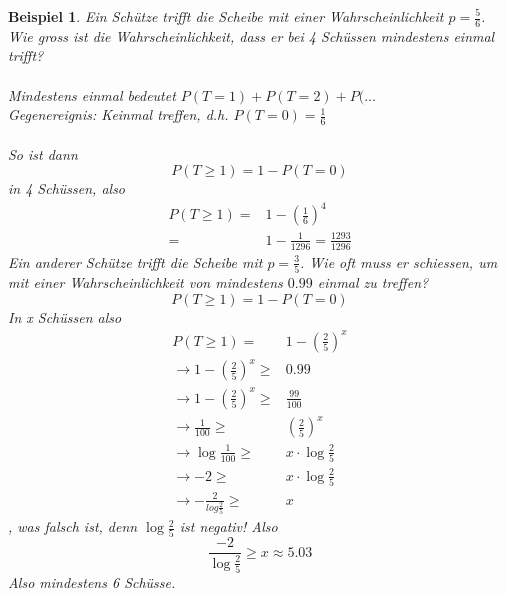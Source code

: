 \documentclass{report}
\newtheorem{myexample}{Beispiel}
\begin{document}
\begin{myexample}
Ein Schütze trifft die Scheibe mit einer Wahrscheinlichkeit $p = \frac{5}{6}$. Wie gross ist die Wahrscheinlichkeit, dass er bei 4 Schüssen mindestens einmal trifft?\\\\
Mindestens einmal bedeutet $P(T=1) + P(T=2) + P(...$\\
Gegenereignis: Keinmal treffen, d.h. $P(T=0) = \frac{1}{6}$\\\\
So ist dann
\begin{equation}
P(T\geq1) = 1 - P(T=0)
\end{equation}
in 4 Schüssen, also
\begin{align*}
P(T \geq 1) =& 1 - (\frac{1}{6})^4\\
=& 1 - \frac{1}{1296} = \frac{1293}{1296}
\end{align*}
Ein anderer Schütze trifft die Scheibe mit $p = \frac{3}{5}$. Wie oft muss er schiessen, um mit einer Wahrscheinlichkeit von mindestens $0.99$ einmal zu treffen?
\begin{equation}
P(T \geq 1) = 1 - P(T=0)
\end{equation}
In x Schüssen also
\begin{align*}
P(T \geq 1) =& 1 - (\frac{2}{5})^x\\
\longrightarrow 1 - (\frac{2}{5})^x \geq & 0.99\\
\longrightarrow 1 - (\frac{2}{5})^x \geq & \frac{99}{100}\\
\longrightarrow \frac{1}{100} \geq & (\frac{2}{5})^x \\
\longrightarrow \log{\frac{1}{100}} \geq & x \cdot \log{\frac{2}{5}} \\
\longrightarrow -2 \geq & x \cdot \log{\frac{2}{5}} \\
\longrightarrow -\frac{2}{log{\frac{2}{5}}} \geq & x
\end{align*}
, was falsch ist, denn $\log{\frac{2}{5}}$ ist negativ! Also
\begin{equation}
\frac{-2}{\log{\frac{2}{5}}} \geq x \approx 5.03
\end{equation}
Also mindestens 6 Schüsse.
\end{myexample}
\end{document}
